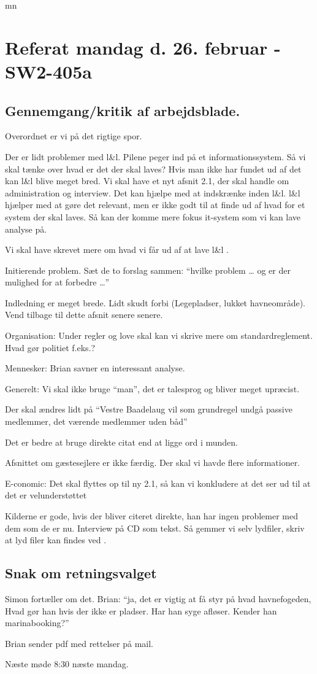 mn\documentclass{article}
\begin{document}
\section{Referat mandag d. 26. februar - SW2-405a}
\subsection{Gennemgang/kritik af arbejdsblade.}

Overordnet er vi på det rigtige spor.

Der er lidt problemer med l\&l. Pilene peger ind på et informationssystem. Så vi skal tænke over hvad er det der skal laves? Hvis man ikke har fundet ud af det kan l\&l blive meget bred. Vi skal have et nyt afsnit 2.1, der skal handle om administration og interview. Det kan hjælpe med at indskrænke inden l\&l. l\&l hjælper med at gøre det relevant, men er ikke godt til at finde ud af hvad for et system der skal laves. Så kan der komme mere fokus it-system som vi kan lave analyse på.

Vi skal have skrevet mere om hvad vi får ud af at lave l\&l .

Initierende problem. Sæt de to forslag sammen: “hvilke problem … og er der mulighed for at forbedre …”

Indledning er meget brede. Lidt skudt forbi (Legepladser, lukket havneområde). Vend tilbage til dette afsnit senere senere.

Organisation: Under regler og love skal kan vi skrive mere om standardreglement. Hvad gør politiet f.eks.?

Mennesker: Brian savner en interessant analyse.

Generelt: Vi skal ikke bruge “man”, det er talesprog og bliver meget upræcist.

Der skal ændres lidt på “Vestre Baadelaug vil som grundregel undgå passive medlemmer, det værende medlemmer uden båd”

Det er bedre at bruge direkte citat end at ligge ord i munden.

Afsnittet om gæstesejlere er ikke færdig. Der skal vi havde flere informationer.

E-conomic: Det skal flyttes op til ny 2.1, så kan vi konkludere at det ser ud til at det er velunderstøttet

Kilderne er gode, hvis der bliver citeret direkte, han har ingen problemer med dem som de er nu. Interview på CD som tekst. Så gemmer vi selv lydfiler, skriv at lyd filer kan findes ved .

\subsection{Snak om retningsvalget}

Simon fortæller om det. Brian: “ja, det er vigtig at få styr på hvad havnefogeden, Hvad gør han hvis der ikke er pladser. Har han syge afløser. Kender han marinabooking?”

Brian sender pdf med rettelser på mail.

Næste møde 8:30 næste mandag.
\end{document}

